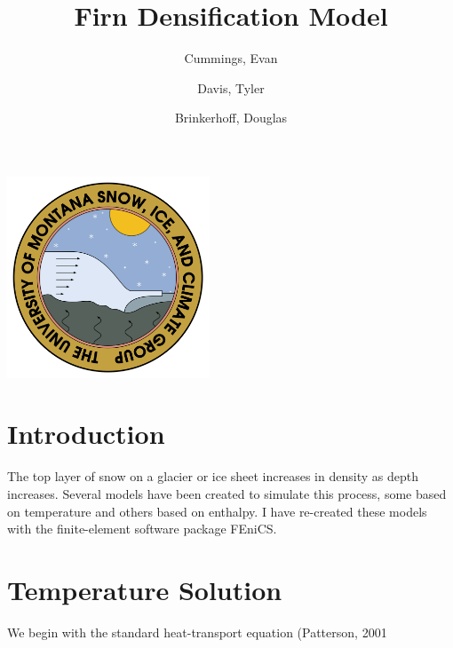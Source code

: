 \documentclass{article}%
\begin{document}

\title{Firn Densification Model}
\author{Cummings, Evan \and Davis, Tyler \and Brinkerhoff, Douglas}
\maketitle
\begin{center}
\includegraphics[width=0.45\textwidth]{images/logo.png}
\end{center}

\twocolumn

\section{Introduction}

The top layer of snow on a glacier or ice sheet increases in density as depth increases.  Several models have been created to simulate this process, some based on temperature and others based on enthalpy.  I have re-created these models with the finite-element software package FEniCS.

\section{Temperature Solution}

We begin with the standard heat-transport equation (Patterson, 2001
\end{document}
